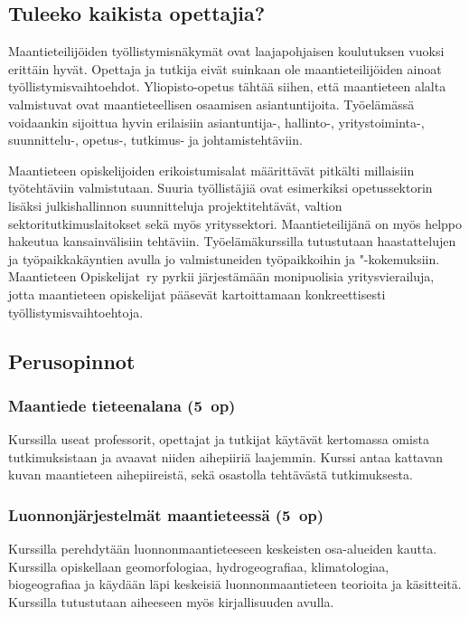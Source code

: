 \documentclass[../ala_hataile.tex]{subfiles}
\begin{document}
\subsection*{Tuleeko kaikista opettajia?}
Maantieteilijöiden työllistymis\-näkymät
ovat laaja\-pohjaisen koulutuksen
vuoksi erittäin hyvät. Opettaja ja
tutkija eivät suinkaan ole maan\-tieteilijöiden
ainoat työllistymis\-vaihtoehdot.
Yliopisto-opetus tähtää siihen, että
maantieteen alalta valmistuvat ovat
maantieteellisen osaamisen asiantuntijoita.
Työelämässä voidaankin sijoittua
hyvin erilaisiin asian\-tuntija-, hallinto-,
yritys\-toiminta-, suunnittelu-, opetus-,
tutkimus- ja johtamis\-tehtäviin.

Maantieteen opiskelijoiden erikoistumis\-alat
määrittävät pitkälti millaisiin
työtehtäviin valmistutaan. Suuria työllistäjiä
ovat esimerkiksi opetus\-sektorin
lisäksi julkis\-hallinnon suunnitteluja
projektitehtävät, valtion sektori\-tutkimus\-laitokset
sekä myös yrityssektori.
Maantieteilijänä on myös helppo
hakeutua kansain\-välisiin tehtäviin.
Työ\-elämä\-kurssilla tutustutaan haastattelujen
ja työpaikkakäyntien avulla
jo valmistuneiden työpaikkoihin ja "-kokemuksiin. Maantieteen Opiskelijat~ry pyrkii järjestämään monipuolisia yritys\-vierailuja,
jotta maantieteen opiskelijat
pääsevät kartoittamaan konkreettisesti
työllistymis\-vaihtoehtoja.

\subsection*{Perusopinnot}
\subsubsection*{Maantiede tieteenalana (5~op)}
Kurssilla useat professorit, opettajat
ja tutkijat käytävät kertomassa omista 
tutkimuksistaan ja avaavat niiden
aihepiiriä laajemmin. Kurssi antaa 
kattavan kuvan maantieteen aihepiireistä,
sekä osastolla tehtävästä tutkimuksesta.

\subsubsection*{Luonnonjärjestelmät maantieteessä (5~op)}
Kurssilla perehdytään luonnonmaantieteeseen
keskeisten osa-alueiden kautta. Kurssilla 
opiskellaan geomorfologiaa, hydrogeografiaa, 
klimatologiaa, biogeografiaa ja käydään läpi 
keskeisiä luonnonmaantieteen
teorioita ja käsitteitä. Kurssilla tutustutaan 
aiheeseen myös kirjallisuuden avulla.
\end{document}
